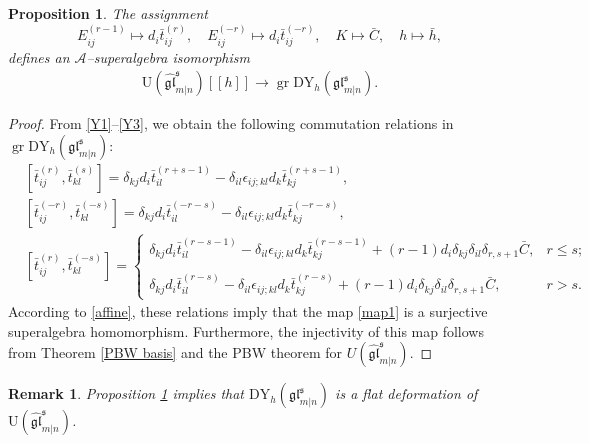 \documentclass[a4paper,12pt]{article}
\newtheorem{rema}[theo]{Remark}
\newtheorem{prop}[theo]{Proposition}
\numberwithin{equation}{section}
\begin{document}
\begin{prop} \label{Iso 1}
The assignment
$$
E_{ij}^{(r-1)}\mapsto d_{i}\bar{t}_{ij}^{(r)},\quad E_{ij}^{(-r)}\mapsto d_{i}\bar{t}_{ij}^{(-r)}, \quad K\mapsto \bar{C},\quad h\mapsto \bar{h},
$$
defines an $\mathcal{A}$--superalgebra isomorphism
\begin{align}\label{map1}
\mathrm{U}(\widehat{\mathfrak{gl}}^{\mathfrak{s}}_{m|n})[[h]]\rightarrow \operatorname{gr} \mathrm{DY}_{h}(\mathfrak{gl}^{\mathfrak{s}}_{m|n}).
\end{align}
\end{prop}
\begin{proof}
From \eqref{Y1}--\eqref{Y3}, we obtain the following commutation relations in $\operatorname{gr}\mathrm{DY}_{h}(\mathfrak{gl}^{\mathfrak{s}}_{m|n}):$
\begin{align*}
&\left[\bar{t}_{ij}^{(r)},\bar{t}_{kl}^{(s)}\right]=\delta_{kj}d_{i}
\bar{t}_{il}^{(r+s-1)}-\delta_{il}\epsilon_{ij;kl}d_{k}\bar{t}_{kj}^{(r+s-1)},\\
&\left[\bar{t}_{ij}^{(-r)},\bar{t}_{kl}^{(-s)}\right]=\delta_{kj}d_{i}
\bar{t}_{il}^{(-r-s)}-\delta_{il}\epsilon_{ij;kl}d_{k}\bar{t}_{kj}
^{(-r-s)},\\
&\left[\bar{t}_{ij}^{(r)},\bar{t}_{kl}^{(-s)}\right]=
\left\{
  \begin{array}{ll}
   \delta_{kj}d_{i}
\bar{t}_{il}^{(r-s-1)}-\delta_{il}\epsilon_{ij;kl}d_{k}\bar{t}_{kj}
^{(r-s-1)}+(r-1)d_{i}\delta_{kj}\delta_{il}\delta_{r,s+1}\bar{C}, & r\leq s; \\
~\\
    \delta_{kj}d_{i}
\bar{t}_{il}^{(r-s)}-\delta_{il}\epsilon_{ij;kl}d_{k}\bar{t}_{kj}
^{(r-s)}+(r-1)d_{i}\delta_{kj}\delta_{il}\delta_{r,s+1}\bar{C}, & r>s.
  \end{array}
\right.
\end{align*}
According to \eqref{affine}, these relations imply that the map \eqref{map1} is a surjective superalgebra homomorphism. Furthermore, the injectivity of this map follows from Theorem \ref{PBW basis} and the PBW theorem for $U(\widehat{\mathfrak{gl}}_{m|n}^{\mathfrak{s}})$.
\end{proof}
\begin{rema}
Proposition \ref{Iso 1} implies that $\mathrm{DY}_{h}(\mathfrak{gl}_{m|n}^{\mathfrak{s}})$ is a flat deformation of $\mathrm{U}(\widehat{\mathfrak{gl}}_{m|n}^{\mathfrak{s}})$.
\end{rema}
\end{document}
